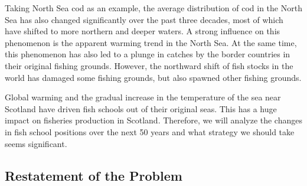 \documentclass{mcmthesis}
\numberwithin{figure}{section}
\numberwithin{table}{section}
\begin{document}
Taking North Sea cod as an example, the average distribution of cod in the North Sea has also changed significantly over the past three decades, most of which have shifted to more northern and deeper waters. A strong influence on this phenomenon is the apparent warming trend in the North Sea. At the same time, this phenomenon has also led to a plunge in catches by the border countries in their original fishing grounds. However, the northward shift of fish stocks in the world has damaged some fishing grounds, but also spawned other fishing grounds.\cite{REF3} 

Global warming and the gradual increase in the temperature of the sea near Scotland have driven fish schools out of their original seas. This has a huge impact on fisheries production in Scotland. Therefore, we will analyze the changes in fish school positions over the next 50 years and what strategy we should take seems significant.

\subsection{Restatement of the Problem}





\end{document}
